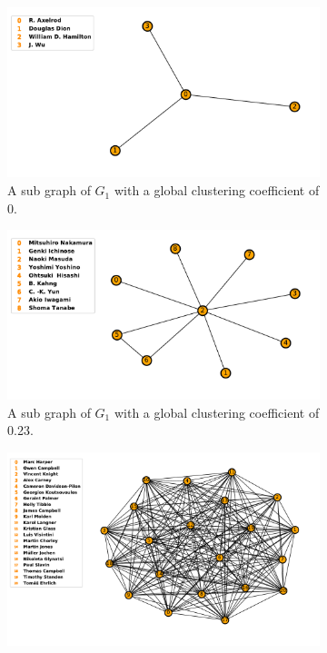 \documentclass{article}
\theoremstyle{definition}
\begin{document}
\begin{center}
    \begin{figure}[!hbtp]
        \begin{subfigure}{0.33\textwidth}
            \includegraphics[width=\textwidth]{./assets/images/clustering_example_one.pdf}
            \caption{A sub graph of \(G_1\) with a global clustering coefficient of 0.}
        \end{subfigure}
        \begin{subfigure}{0.33\textwidth}
            \includegraphics[width=\textwidth]{./assets/images/clustering_example_two.pdf}
            \caption{A sub graph of \(G_1\) with a global clustering coefficient of 0.23.}
        \end{subfigure}
        \begin{subfigure}{0.33\textwidth}
            \includegraphics[width=\textwidth]{./assets/images/clustering_example_three.pdf}

\end{subfigure}
\end{figure}
\end{center}
\end{document}
